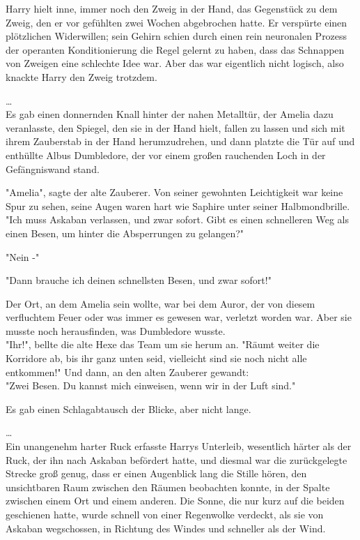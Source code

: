 {Harry hielt inne, immer noch den Zweig in der Hand, das Gegenstück zu dem Zweig, den er vor gefühlten zwei Wochen abgebrochen hatte. Er verspürte einen plötzlichen Widerwillen; sein Gehirn schien durch einen rein neuronalen Prozess der operanten Konditionierung die Regel gelernt zu haben, dass das Schnappen von Zweigen eine schlechte Idee war. Aber das war eigentlich nicht logisch, also knackte Harry den Zweig trotzdem.

…\\ Es gab einen donnernden Knall hinter der nahen Metalltür, der Amelia dazu veranlasste, den Spiegel, den sie in der Hand hielt, fallen zu lassen und sich mit ihrem Zauberstab in der Hand herumzudrehen, und dann platzte die Tür auf und enthüllte Albus Dumbledore, der vor einem großen rauchenden Loch in der Gefängniswand stand.

"Amelia", sagte der alte Zauberer. Von seiner gewohnten Leichtigkeit war keine Spur zu sehen, seine Augen waren hart wie Saphire unter seiner Halbmondbrille. "Ich muss Askaban verlassen, und zwar sofort. Gibt es einen schnelleren Weg als einen Besen, um hinter die Absperrungen zu gelangen?"

"Nein -"

"Dann brauche ich deinen schnellsten Besen, und zwar sofort!"

Der Ort, an dem Amelia sein wollte, war bei dem Auror, der von diesem verfluchtem Feuer oder was immer es gewesen war, verletzt worden war. Aber sie musste noch herausfinden, was Dumbledore wusste.\\ "Ihr!", bellte die alte Hexe das Team um sie herum an. "Räumt weiter die Korridore ab, bis ihr ganz unten seid, vielleicht sind sie noch nicht alle entkommen!" Und dann, an den alten Zauberer gewandt:\\ "Zwei Besen. Du kannst mich einweisen, wenn wir in der Luft sind."

Es gab einen Schlagabtausch der Blicke, aber nicht lange.

…\\ Ein unangenehm harter Ruck erfasste Harrys Unterleib, wesentlich härter als der Ruck, der ihn nach Askaban befördert hatte, und diesmal war die zurückgelegte Strecke groß genug, dass er einen Augenblick lang die Stille hören, den unsichtbaren Raum zwischen den Räumen beobachten konnte, in der Spalte zwischen einem Ort und einem anderen. Die Sonne, die nur kurz auf die beiden geschienen hatte, wurde schnell von einer Regenwolke verdeckt, als sie von Askaban wegschossen, in Richtung des Windes und schneller als der Wind.

}
